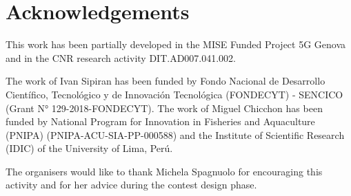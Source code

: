 \documentclass[twocolumn]{article}
\begin{document}
\section*{Acknowledgements}
This work has been partially developed in the MISE Funded Project 5G Genova and in the CNR research activity DIT.AD007.041.002.

The work of Ivan Sipiran has been funded by Fondo Nacional de Desarrollo Científico, Tecnológico y de Innovación Tecnológica (FONDECYT) - SENCICO (Grant N° 129-2018-FONDECYT). 
The work of Miguel Chicchon has been funded by National Program for Innovation in Fisheries and Aquaculture (PNIPA) (PNIPA-ACU-SIA-PP-000588) and the Institute of Scientific Research (IDIC) of the University of Lima, Perú.

The organisers would like to thank Michela Spagnuolo for encouraging this activity and for her advice during the contest design phase.
\end{document}
